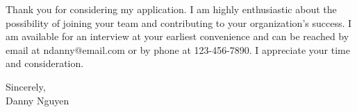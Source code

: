 \documentclass[letterpaper,11pt]{article}
\begin{document}
\vspace{20pt}
Thank you for considering my application. I am highly enthusiastic about the possibility of joining your team and contributing to your organization's success. I am available for an interview at your earliest convenience and can be reached by email at ndanny@email.com or by phone at 123-456-7890. I appreciate your time and consideration.
\vspace{20pt}


Sincerely,\\
\vspace{40pt} %
Danny Nguyen

\end{document}
